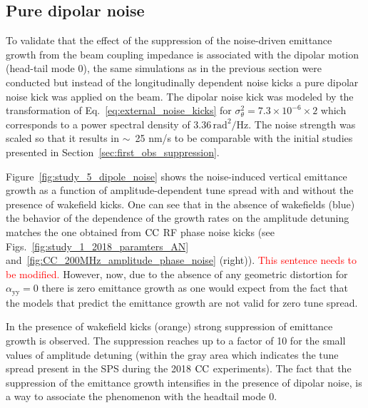 

\subsection{Pure dipolar noise}\label{subsec:dipole_noise}
To validate that the effect of the suppression of the noise-driven emittance growth from the beam coupling impedance is associated with the dipolar motion (head-tail mode 0), the same simulations as in the previous section were conducted but instead of the longitudinally dependent noise kicks a pure dipolar noise kick was applied on the beam. The dipolar noise kick was modeled by the transformation of Eq.~\eqref{eq:external_noise_kicks} for $\sigma_\theta^2=7.3\times 10^{-6} \times 2$ which corresponds to a power spectral density of 3.36\,$\mathrm{rad^2/Hz}$. The noise strength was scaled so that it results in $\sim$~25 nm/s to be comparable with the initial studies presented in Section~\ref{sec:first_obs_suppression}.

Figure~\ref{fig:study_5_dipole_noise} shows the noise-induced vertical emittance growth as a function of amplitude-dependent tune spread with and without the presence of wakefield kicks. One can see that in the absence of wakefields (blue) the behavior of the dependence of the growth rates on the amplitude detuning matches the one obtained from ${\mathrm{CC}}$ RF phase noise kicks (see Figs.~\ref{fig:study_1_2018_paramters_AN} and~\ref{fig:CC_200MHz_amplitude_phase_noise} (right)). \textcolor{red}{This sentence needs to be modified.} However, now, due to the absence of any geometric distortion for $\alpha_\mathrm{yy}=0$ there is zero emittance growth as one would expect from the fact that the models that predict the emittance growth are not valid for zero tune spread.

In the presence of wakefield kicks (orange) strong suppression of emittance growth is observed. The suppression reaches up to a factor of 10 for the small values of amplitude detuning (within the gray area which indicates the tune spread present in the SPS during the 2018 ${\mathrm{CC}}$ experiments). The fact that the suppression of the emittance growth intensifies in the presence of dipolar noise, is a way to associate the phenomenon with the headtail mode 0.

